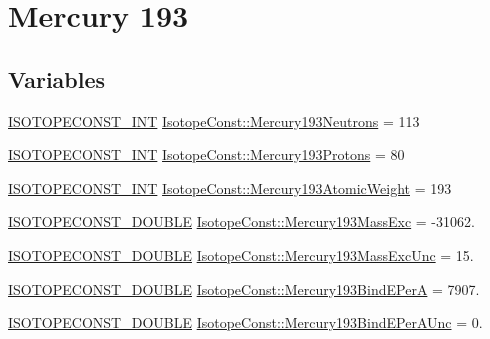 \hypertarget{group___isotope_const-_mercury-_hg193}{}\section{Mercury 193}
\label{group___isotope_const-_mercury-_hg193}
\subsection*{Variables}
\begin{DoxyCompactItemize}
\item 
\mbox{\hyperlink{group___isotope_const-_macros_ga5f18360b3e99483a35c32d789e62621c}{I\+S\+O\+T\+O\+P\+E\+C\+O\+N\+S\+T\+\_\+\+I\+NT}} \mbox{\hyperlink{group___isotope_const-_mercury-_hg193_ga81a35a74df0208d6dd245ed9e5d4c289}{Isotope\+Const\+::\+Mercury193\+Neutrons}} = 113
\item 
\mbox{\hyperlink{group___isotope_const-_macros_ga5f18360b3e99483a35c32d789e62621c}{I\+S\+O\+T\+O\+P\+E\+C\+O\+N\+S\+T\+\_\+\+I\+NT}} \mbox{\hyperlink{group___isotope_const-_mercury-_hg193_gaad27a2418177403bab258b17c06a8892}{Isotope\+Const\+::\+Mercury193\+Protons}} = 80
\item 
\mbox{\hyperlink{group___isotope_const-_macros_ga5f18360b3e99483a35c32d789e62621c}{I\+S\+O\+T\+O\+P\+E\+C\+O\+N\+S\+T\+\_\+\+I\+NT}} \mbox{\hyperlink{group___isotope_const-_mercury-_hg193_ga5d36552f6a8df7403c928db298622009}{Isotope\+Const\+::\+Mercury193\+Atomic\+Weight}} = 193
\item 
\mbox{\hyperlink{group___isotope_const-_macros_ga8f45a7272ce02c0b4c65c44636ed719a}{I\+S\+O\+T\+O\+P\+E\+C\+O\+N\+S\+T\+\_\+\+D\+O\+U\+B\+LE}} \mbox{\hyperlink{group___isotope_const-_mercury-_hg193_ga07823aa316c547246f6b3740f02c2f6a}{Isotope\+Const\+::\+Mercury193\+Mass\+Exc}} = -\/31062.
\item 
\mbox{\hyperlink{group___isotope_const-_macros_ga8f45a7272ce02c0b4c65c44636ed719a}{I\+S\+O\+T\+O\+P\+E\+C\+O\+N\+S\+T\+\_\+\+D\+O\+U\+B\+LE}} \mbox{\hyperlink{group___isotope_const-_mercury-_hg193_ga371846459b79d0fe926a73cf85f67888}{Isotope\+Const\+::\+Mercury193\+Mass\+Exc\+Unc}} = 15.
\item 
\mbox{\hyperlink{group___isotope_const-_macros_ga8f45a7272ce02c0b4c65c44636ed719a}{I\+S\+O\+T\+O\+P\+E\+C\+O\+N\+S\+T\+\_\+\+D\+O\+U\+B\+LE}} \mbox{\hyperlink{group___isotope_const-_mercury-_hg193_ga3b549d894a71d0ebb54bd5bf0024067c}{Isotope\+Const\+::\+Mercury193\+Bind\+E\+PerA}} = 7907.
\item 
\mbox{\hyperlink{group___isotope_const-_macros_ga8f45a7272ce02c0b4c65c44636ed719a}{I\+S\+O\+T\+O\+P\+E\+C\+O\+N\+S\+T\+\_\+\+D\+O\+U\+B\+LE}} \mbox{\hyperlink{group___isotope_const-_mercury-_hg193_gaecbf9b673033e528db25a666eda61fe5}{Isotope\+Const\+::\+Mercury193\+Bind\+E\+Per\+A\+Unc}} = 0.

\end{DoxyCompactItemize}
